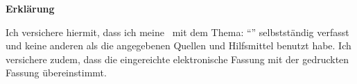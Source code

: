 

\newpage
\thispagestyle{empty}
\begin{framed}
\begin{center}
\Large\bfseries Erklärung
\end{center}
\medskip
\noindent
Ich versichere hiermit, dass ich meine \Was \ mit dem Thema:
\enquote{\Titel}
selbstständig verfasst und keine anderen als die angegebenen Quellen und Hilfsmittel benutzt habe. Ich versichere zudem, dass die eingereichte elektronische Fassung mit der gedruckten Fassung übereinstimmt. \\
\vspace{3cm} \\
\end{framed}

\endinput
